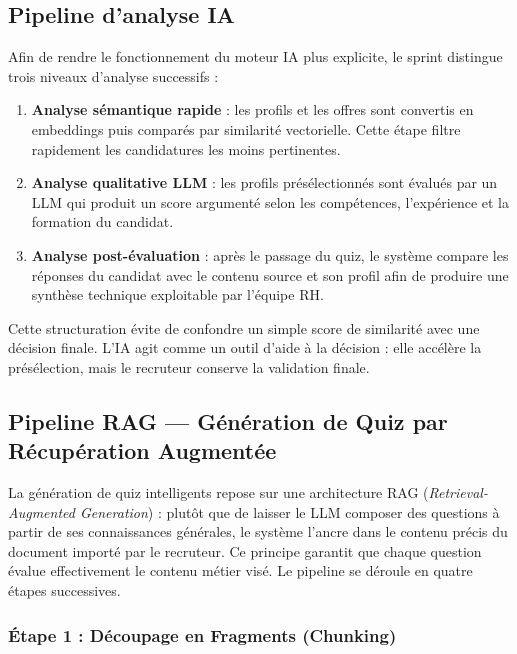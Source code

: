 \subsection{Pipeline d'analyse IA}

Afin de rendre le fonctionnement du moteur IA plus explicite, le sprint distingue trois niveaux d'analyse successifs :

\begin{enumerate}
    \item \textbf{Analyse sémantique rapide} : les profils et les offres sont convertis en embeddings puis comparés par similarité vectorielle. Cette étape filtre rapidement les candidatures les moins pertinentes.
    \item \textbf{Analyse qualitative LLM} : les profils présélectionnés sont évalués par un LLM qui produit un score argumenté selon les compétences, l'expérience et la formation du candidat.
    \item \textbf{Analyse post-évaluation} : après le passage du quiz, le système compare les réponses du candidat avec le contenu source et son profil afin de produire une synthèse technique exploitable par l'équipe RH.
\end{enumerate}

Cette structuration évite de confondre un simple score de similarité avec une décision finale. L'IA agit comme un outil d'aide à la décision : elle accélère la présélection, mais le recruteur conserve la validation finale.

\subsection{Pipeline RAG — Génération de Quiz par Récupération Augmentée}
\label{sec:rag_pipeline}

La génération de quiz intelligents repose sur une architecture RAG (\textit{Retrieval-Augmented Generation}) : plutôt que de laisser le LLM composer des questions à partir de ses connaissances générales, le système l'ancre dans le contenu précis du document importé par le recruteur. Ce principe garantit que chaque question évalue effectivement le contenu métier visé. Le pipeline se déroule en quatre étapes successives.

\subsubsection{Étape 1 : Découpage en Fragments (Chunking)}


